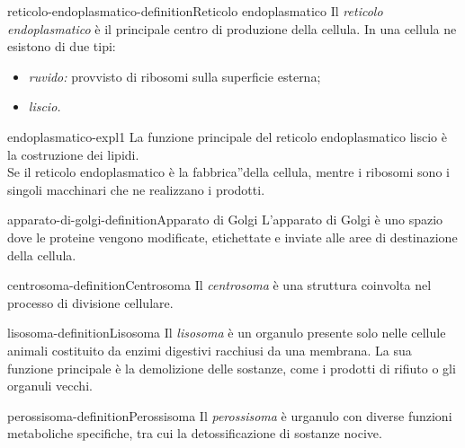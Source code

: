 \documentclass[preview]{standalone}
\begin{document}
\begin{snippetdefinition}{reticolo-endoplasmatico-definition}{Reticolo endoplasmatico}
    Il \textit{reticolo endoplasmatico} è il principale centro di produzione
    della cellula.
    In una cellula ne esistono di due tipi:
    \begin{itemize}
        \item \textit{ruvido:} provvisto di ribosomi sulla superficie esterna;
        \item \textit{liscio.}
    \end{itemize}
\end{snippetdefinition}

\begin{snippet}{endoplasmatico-expl1}
    La funzione principale del reticolo endoplasmatico liscio è
    la costruzione dei lipidi.\\
    Se il reticolo endoplasmatico è la fabbrica”della cellula, mentre i ribosomi sono i singoli macchinari che ne
    realizzano i prodotti.
\end{snippet}

\begin{snippetdefinition}{apparato-di-golgi-definition}{Apparato di Golgi}
    L'apparato di Golgi è uno spazio dove le proteine
    vengono modificate, etichettate e inviate alle aree di destinazione della cellula.
\end{snippetdefinition}


\begin{snippetdefinition}{centrosoma-definition}{Centrosoma}
    Il \textit{centrosoma} è una struttura coinvolta nel processo di divisione cellulare.
\end{snippetdefinition}

\begin{snippetdefinition}{lisosoma-definition}{Lisosoma}
    Il \textit{lisosoma} è un organulo presente solo nelle cellule animali costituito da enzimi digestivi
    racchiusi da una membrana.
    La sua funzione principale è la demolizione delle sostanze,
    come i prodotti di rifiuto o gli organuli vecchi.
\end{snippetdefinition}

\begin{snippetdefinition}{perossisoma-definition}{Perossisoma}
    Il \textit{perossisoma} è urganulo con diverse funzioni metaboliche specifiche, tra cui la detossificazione di
    sostanze nocive.
\end{snippetdefinition}
\end{document}
